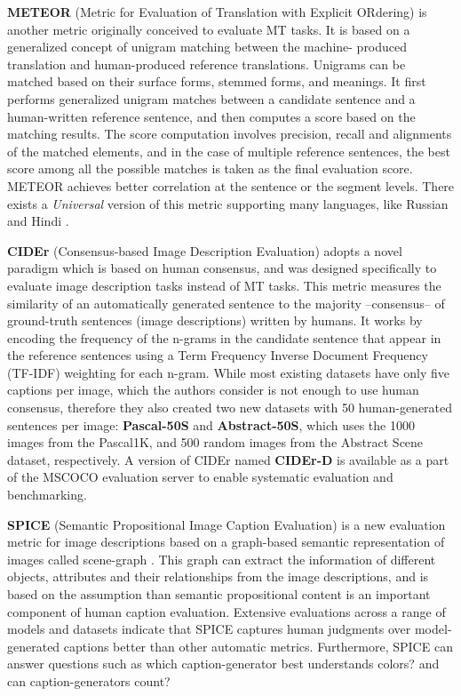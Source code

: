 \textbf{METEOR} (Metric for Evaluation of Translation with Explicit ORdering) \citep{Banerjee2005} is another metric originally conceived to evaluate MT tasks. It is based on a generalized concept of unigram matching between the machine- produced translation and human-produced reference translations. Unigrams can be matched based on their surface forms, stemmed forms, and meanings. It first performs generalized unigram matches between a candidate sentence and a human-written reference sentence, and then computes a score based on the matching results. The score computation involves precision, recall and alignments of the matched elements, and in the case of multiple reference sentences, the best score among all the possible matches is taken as the final evaluation score. METEOR achieves better correlation at the sentence or the segment levels. There exists a \textit{Universal} version of this metric supporting many languages, like Russian and Hindi \citet{Denkowski2014}.

\textbf{CIDEr} (Consensus-based Image Description Evaluation) \citep{Vedantam2015} adopts a novel paradigm which is based on human consensus, and was designed specifically to evaluate image description tasks instead of MT tasks. This metric measures the similarity of an automatically generated sentence to the majority --consensus-- of ground-truth sentences (image descriptions) written by humans. It works by encoding the frequency of the n-grams in the candidate sentence that appear in the reference sentences using a Term Frequency Inverse Document Frequency (TF-IDF) weighting for each n-gram. While most existing datasets have only five captions per image, which the authors consider is not enough to use human consensus, therefore they also created two new datasets with 50 human-generated sentences per image: \textbf{Pascal-50S} and \textbf{Abstract-50S}, which uses the 1000 images from the Pascal1K, and 500 random images from the Abstract Scene dataset, respectively. A version of CIDEr named \textbf{CIDEr-D} is available as a part of the MSCOCO evaluation server to enable systematic evaluation and benchmarking.

\textbf{SPICE} (Semantic Propositional Image Caption Evaluation) \citep{Anderson2016} is a new evaluation metric for image descriptions based on a graph-based semantic representation of images called scene-graph \citep{Johnson2015, Schuster2015}. This graph can extract the information of different objects, attributes and their relationships from the image descriptions, and is based on the assumption than semantic propositional content is an important component of human caption evaluation. Extensive evaluations across a range of models and datasets indicate that SPICE captures human judgments over model-generated captions better than other automatic metrics. Furthermore, SPICE can answer questions such as which caption-generator best understands colors? and can caption-generators count?

